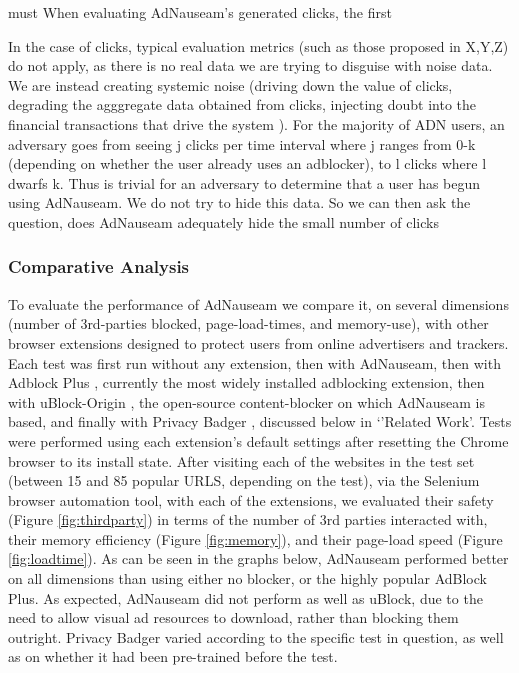 \documentclass[conference]{IEEEtran}
\begin{document}
 must When evaluating AdNauseam's generated clicks, the first

In the case of clicks, typical evaluation metrics (such as those proposed in X,Y,Z) do not apply, as there is no real data we are trying to disguise with noise data. We are instead creating systemic noise (driving down the value of clicks, degrading the agggregate data obtained from clicks, injecting doubt into the financial transactions that drive the system ). For the majority of ADN users, an adversary goes from seeing j clicks per time interval where j ranges from 0-k (depending on whether the user already uses an adblocker), to l clicks where l dwarfs k. Thus is trivial for an adversary to determine that a user has begun using AdNauseam. We do not try to hide this data. So we can then ask the question, does AdNauseam adequately hide the small number of clicks

%

\subsubsection{Comparative Analysis}

To evaluate the performance of AdNauseam we compare it, on several dimensions (number of 3rd-parties blocked, page-load-times, and memory-use), with other  browser extensions designed to protect users from online advertisers and trackers. Each test was first run without any extension, then with AdNauseam, then with Adblock Plus \cite{AdBlock}, currently the most widely installed adblocking extension, then with uBlock-Origin \cite{Gorhill}, the open-source content-blocker on which AdNauseam is based, and finally with Privacy Badger \cite{EFF}, discussed below in `'Related Work'. Tests were performed using each extension's default settings after resetting the Chrome browser to its install state. After visiting each of the websites in the test set (between 15 and 85 popular URLS, depending on the test), via the Selenium browser automation tool, with each of the extensions, we evaluated their safety (Figure \ref{fig:thirdparty}) in terms of the number of 3rd parties interacted with, their memory efficiency (Figure \ref{fig:memory}), and their page-load speed (Figure \ref{fig:loadtime}). As can be seen in the graphs below, AdNauseam performed better on all dimensions than using either no blocker, or the highly popular AdBlock Plus. As expected, AdNauseam did not perform as well as uBlock, due to the need to allow visual ad resources to download, rather than blocking them outright. Privacy Badger varied according to the specific test in question, as well as on whether it had been pre-trained before the test.
\end{document}
